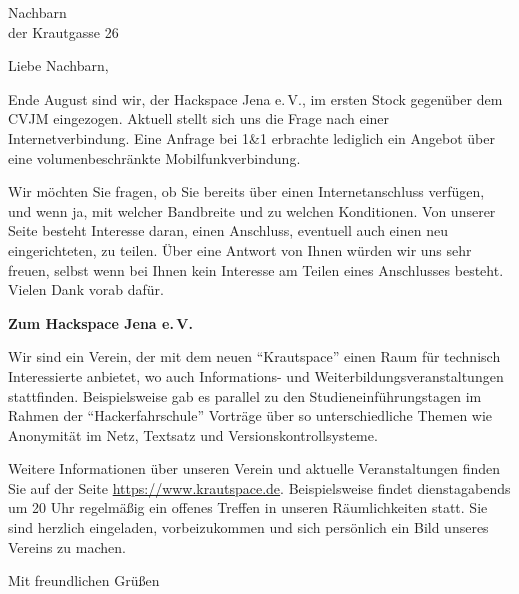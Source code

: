 \documentclass[fontsize=12pt,paper=a4,DIN]{scrlttr2}
\begin{document}


\begin{letter}{Nachbarn \\ der Krautgasse 26}


\opening{Liebe Nachbarn,}

Ende August sind wir, der Hackspace Jena e.\,V., im ersten Stock 
gegenüber dem CVJM eingezogen. Aktuell stellt sich uns die Frage 
nach einer Internetverbindung. Eine Anfrage bei 1\&1 erbrachte 
lediglich ein Angebot über eine volumenbeschränkte 
Mobilfunkverbindung.

Wir möchten Sie fragen, ob Sie bereits über einen Internetanschluss 
verfügen, und wenn ja, mit welcher Bandbreite und zu welchen 
Konditionen. Von unserer Seite besteht Interesse daran, einen 
Anschluss, eventuell auch einen neu eingerichteten, zu teilen. Über 
eine Antwort von Ihnen würden wir uns sehr freuen, selbst wenn bei 
Ihnen kein Interesse am Teilen eines Anschlusses besteht. Vielen 
Dank vorab dafür.

\textbf{Zum Hackspace Jena e.\,V.} 

Wir sind ein Verein, der mit dem neuen "`Krautspace"' einen Raum für 
technisch Interessierte anbietet, wo auch Informations- und 
Weiterbildungsveranstaltungen stattfinden. Beispielsweise gab es 
parallel zu den Studieneinführungstagen im Rahmen der 
"`Hackerfahrschule"' Vorträge über so unterschiedliche Themen wie 
Anonymität im Netz, Textsatz und Versionskontrollsysteme.

Weitere Informationen über unseren Verein und aktuelle 
Veranstaltungen finden Sie auf der Seite 
\url{https://www.krautspace.de}. Beispielsweise findet dienstagabends um 
20 Uhr regelmäßig ein offenes Treffen in unseren Räumlichkeiten 
statt. Sie sind herzlich eingeladen, vorbeizukommen und sich 
persönlich ein Bild unseres Vereins zu machen.

\closing{Mit freundlichen Grüßen}

\end{letter}
\end{document}
